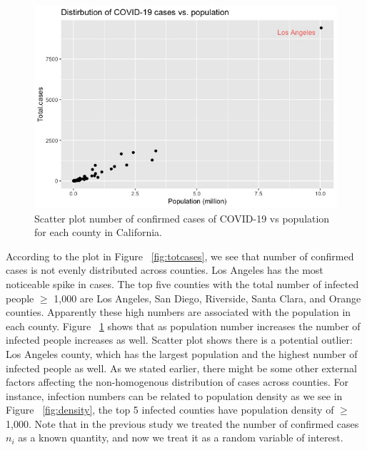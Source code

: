 \documentclass[11pt,twocolumn]{asaproc}
\begin{document}
\begin{figure}[t]
\centering\includegraphics[scale=.31]{inf_vs_pop.jpeg}
\caption{Scatter plot number of confirmed cases of COVID-19 vs population for each county in California.}
\label{fig:infpop}
\end{figure}

According to the plot in Figure ~\ref{fig:totcases}, we see that number of confirmed cases is not evenly distributed across counties. Los Angeles has the most noticeable spike in cases. The top five counties with the total number of infected people $\geq$ 1,000 are Los Angeles, San Diego, Riverside, Santa Clara, and Orange counties. Apparently these high numbers are associated with the population in each county. Figure ~\ref{fig:infpop} shows that as population number increases the number of infected people increases as well. Scatter plot shows there is a potential outlier: Los Angeles county, which has the largest population and the highest number of infected people as well. As we stated earlier, there might be some other external factors affecting the non-homogenous distribution of cases across counties. For instance, infection numbers can be related to population density as we see in Figure ~\ref{fig:density},  the top 5 infected counties have population density of $\geq$ 1,000. Note that in the previous study we treated the number of confirmed cases $n_i$ as a known quantity, and now we treat it as a random variable of interest. 
\end{document}
